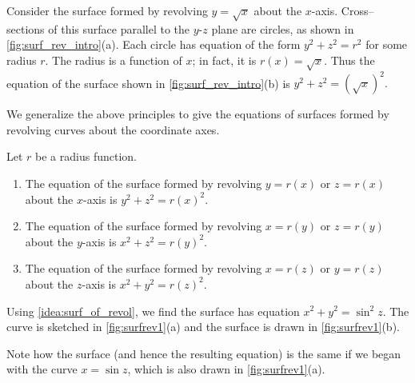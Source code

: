 Consider the surface formed by revolving $y=\sqrt{x}$ about the $x$-axis. Cross--sections of this surface parallel to the $y$-$z$ plane are circles, as shown in \autoref{fig:surf_rev_intro}(a). Each circle has equation of the form $y^2+z^2=r^2$ for some radius $r$. The radius is a function of $x$; in fact, it is $r(x) = \sqrt{x}$. Thus the equation of the surface shown in \autoref{fig:surf_rev_intro}(b) is $y^2+z^2=(\sqrt{x})^2.$

We generalize the above principles to give the equations of surfaces formed by revolving curves about the coordinate axes.

{Let $r$ be a radius function. 
\begin{enumerate}
	\item The equation of the surface formed by revolving $y=r(x)$ or $z=r(x)$ about the $x$-axis is $y^2+z^2=r(x)^2$.
	\item The equation of the surface formed by revolving $x=r(y)$ or $z=r(y)$ about the $y$-axis is $x^2+z^2=r(y)^2$.
	\item The equation of the surface formed by revolving $x=r(z)$ or $y=r(z)$ about the $z$-axis is $x^2+y^2=r(z)^2$.
\end{enumerate}}

{%
%
Using \autoref{idea:surf_of_revol}, we find the surface has equation $x^2+y^2=\sin^2z$. The curve is sketched in \autoref{fig:surfrev1}(a) and the surface is drawn in \autoref{fig:surfrev1}(b).

Note how the surface (and hence the resulting equation) is the same if we began with the curve $x=\sin z$, which is also drawn in \autoref{fig:surfrev1}(a).}

